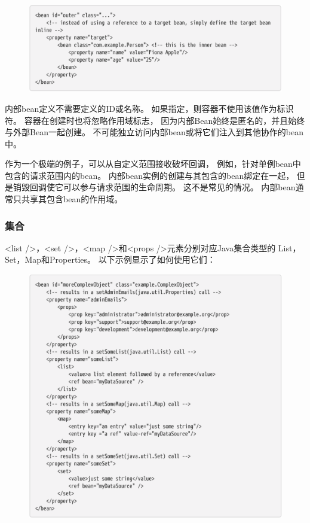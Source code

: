 \begin{figure}[ht]
    \centering
    \includegraphics[width=1\linewidth]{./Figure/IMG_code_40.png}
\end{figure}

内部bean定义不需要定义的ID或名称。
如果指定，则容器不使用该值作为标识符。
容器在创建时也将忽略作用域标志，
因为内部Bean始终是匿名的，并且始终与外部Bean一起创建。
不可能独立访问内部bean或将它们注入到其他协作的bean中。

作为一个极端的例子，可以从自定义范围接收破坏回调，
例如，针对单例bean中包含的请求范围内的bean。 
内部bean实例的创建与其包含的bean绑定在一起，
但是销毁回调使它可以参与请求范围的生命周期。 
这不是常见的情况。 内部bean通常只共享其包含bean的作用域。

\newpage
\subsubsection{集合}
<list />，<set />，<map />和<props />元素分别对应Java集合类型的
List，Set，Map和Properties。 以下示例显示了如何使用它们：

\begin{figure}[ht]
    \centering
    \includegraphics[width=1\linewidth]{./Figure/IMG_code_41.png}
\end{figure}

